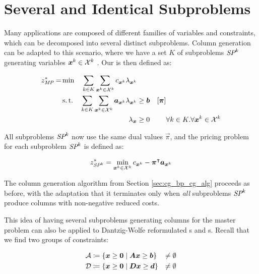 \section{Several and Identical Subproblems}\label{sec:cg_bp_idsp}
Many applications are composed of different families of variables and constraints, which can be decomposed into several distinct subproblems. Column generation can be adapted to this scenario, where we have a set $K$ of subproblems $\SP{k}$ generating variables ${\bm{x}}^k \in \mathcal{X}^k$ \cite{thebook}. Our \MP{} is then defined as:

\begin{equation}
\begin{aligned}
z^*_{\textit{MP}}{} = &\min & \sum_{k \in K}\sum_{{\bm{x}}^k \in \mathcal{X}^k} c_{{\bm{x}}^k} \lambda_{{\bm{x}}^k} & & & \\
&\operatorname{s.t.} & \sum_{k \in K}\sum_{{\bm{x}}^k \in \mathcal{X}^k} {\bm{a}}_{{\bm{x}}^k} \lambda_{{\bm{x}}^k} & \geq {\bm{b}} & \left[{\bm{\pi}}\right] & \\
&& \lambda_{\bm{x}} & \geq 0 & & \forall k \in K. \forall {{\bm{x}}^k} \in \mathcal{X}^k
\end{aligned}
\end{equation}

All subproblems $\SP{k}$ now use the same dual values $\vec{\pi}$, and the pricing problem for each subproblem $\SP{k}$ is defined as:

\begin{equation}
\begin{aligned}
z^*_\SP{k} = \underset{\vec{x}^k \in \indexset{X}^k}{\min} \, c_{\vec{x}^k} - \vec{\pi}\transpose \vec{a}_{\vec{x}^k}
\end{aligned}
\end{equation}

The column generation algorithm from Section \ref{sec:cg_bp_cg_alg} proceeds as before, with the adaptation that it terminates only when \textit{all} subproblems $\SP{k}$ produce columns with non-negative reduced costs.

This idea of having several subproblems generating columns for the master problem can also be applied to Dantzig-Wolfe reformulated \LP{}s and \IP{}s. Recall that we find two groups of constraints:

\begin{equation}
\begin{aligned}
\mathcal{A} &\coloneqq \left\{ {\bm{x}} \geq {\bm{0}} \mid {\bm{A}} {\bm{x}} \geq {\bm{b}} \right\} &\neq \emptyset \\
\mathcal{D} &\coloneqq \left\{ {\bm{x}} \geq {\bm{0}} \mid {\bm{D}} {\bm{x}} \geq {\bm{d}} \right\} &\neq \emptyset
\end{aligned}
\end{equation}


